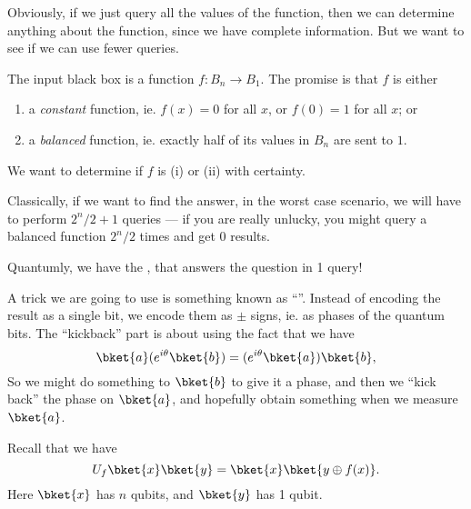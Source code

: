 \documentclass[a4paper]{article}
\begin{document}
Obviously, if we just query all the values of the function, then we can determine anything about the function, since we have complete information. But we want to see if we can use fewer queries.

\begin{eg}
  The input black box is a function $f: B_n \to B_1$. The promise is that $f$ is either
  \begin{enumerate}
    \item a \emph{constant} function, ie. $f(x) = 0$ for all $x$, or $f(0) = 1$ for all $x$; or
    \item a \emph{balanced} function, ie. exactly half of its values in $B_n$ are sent to $1$.
  \end{enumerate}
  We want to determine if $f$ is (i) or (ii) with certainty.

  Classically, if we want to find the answer, in the worst case scenario, we will have to perform $2^n/2 + 1$ queries --- if you are really unlucky, you might query a balanced function $2^n/2$ times and get $0$ results.

  Quantumly, we have the , that answers the question in 1 query!

  A trick we are going to use is something known as ``''. Instead of encoding the result as a single bit, we encode them as $\pm$ signs, ie. as phases of the quantum bits. The ``kickback'' part is about using the fact that we have
  \[
    \bket{a} (e^{i\theta}\bket{b}) = (e^{i\theta}\bket{a})\bket{b},
  \]
  So we might do something to $\bket{b}$ to give it a phase, and then we ``kick back'' the phase on $\bket{a}$, and hopefully obtain something when we measure $\bket{a}$.

  Recall that we have
  \[
    U_f \bket{x}\bket{y} = \bket{x} \bket{y \oplus f(x)}.
  \]
  Here $\bket{x}$ has $n$ qubits, and $\bket{y}$ has 1 qubit.


\end{eg}
\end{document}
